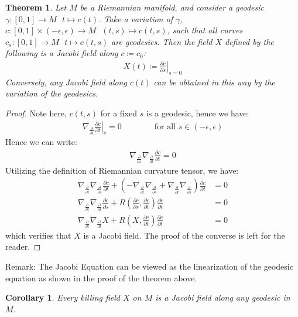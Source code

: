 \documentclass[11pt]{book}
\theoremstyle{break}
\theoremstyle{break}
\newtheorem{thm}{Theorem}[section]
\newtheorem{corT}[lem]{Corollary}
\newcommand{\pd}{\partial}
\newcommand{\remark}{\color{blue}Remark: \color{black}}
\begin{document}
\newpage
\begin{thm}
Let $M$ be a Riemannian manifold, and consider a geodesic $\gamma:[0,1]\to M \ \ \ t\mapsto c(t)$. Take a variation of $\gamma$, $c:[0,1]\times (-\epsilon, \epsilon) \to M \ \ \ (t,s) \mapsto c(t,s)$, such that all curves $c_s:[0,1]\to M \ \ \ t\mapsto c(t,s)$ are geodesics. Then the field $X$ defined by the following is a Jacobi field along $c \coloneqq c_0$:
\begin{align*}
X(t) \coloneqq \left.\frac{\pd c}{\pd s}\right|_{s= 0} 
\end{align*}
Conversely, any Jacobi field along $c(t)$ can be obtained in this way by the variation of the geodesics. 
\end{thm}
\begin{proof}
Note here, $c(t,s)$ for a fixed $s$ is a geodesic, hence we have:
\begin{align*}
\nabla_{\frac{\pd}{\pd t}}\left.\frac{\pd c}{\pd t}\right|_s = 0 \qquad\qquad \text{for all }s \in (-\epsilon,\epsilon)
\end{align*}
Hence we can write:
\begin{align*}
\nabla_{\frac{\pd }{\pd s}} \nabla_{\frac{\pd}{\pd t}}\frac{\pd c}{\pd t} = 0
\end{align*}
Utilizing the definition of Riemannian curvature tensor, we have:
\begin{align*}
\nabla_{\frac{\pd}{\pd t}}\nabla_{\frac{\pd}{\pd s}} \frac{\pd c}{\pd t} + \left( -\nabla_{\frac{\pd}{\pd t}}\nabla_{\frac{\pd}{\pd s}} + \nabla_{\frac{\pd}{\pd t}}\nabla_{\frac{\pd}{\pd s}}\right) \frac{\pd c}{\pd t} &= 0\\
\nabla_{\frac{\pd}{\pd t}}\nabla_{\frac{\pd}{\pd t}}\frac{\pd c}{\pd s} + R\left(\frac{\pd c}{\pd s}, \frac{\pd c}{\pd t}\right) \frac{\pd c}{\pd t} &=0\\
\nabla_{\frac{\pd}{\pd t}}\nabla_{\frac{\pd }{\pd t}}X + R\left(X,\frac{\pd c}{\pd t}\right) \frac{\pd c}{\pd t} &= 0
\end{align*}
which verifies that $X$ is a Jacobi field. The proof of the converse is left for the reader. 
\end{proof}

\remark The Jacobi Equation can be viewed as the linearization of the geodesic equation as shown in the proof of the theorem above. \\

\begin{corT}
Every killing field $X$ on $M$ is a Jacobi field along any geodesic in $M$. 
\end{corT}
\end{document}
